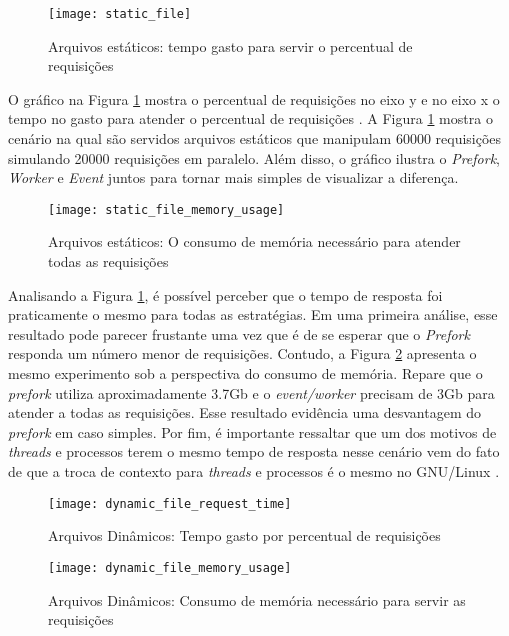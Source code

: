 \begin{figure}[!h]
  \centering
  \texttt{[image: static\_file]}
  \caption{Arquivos estáticos: tempo gasto para servir o percentual de requisições}
  \label{fig:static_file}
\end{figure}

O gráfico na Figura \ref{fig:static_file} mostra o percentual de requisições no
eixo y e no eixo x o tempo no gasto para atender o percentual de requisições
\citep{apache_ab}. A Figura \ref{fig:static_file} mostra o cenário na qual são
servidos arquivos estáticos que manipulam 60000 requisições simulando 20000
requisições em paralelo. Além disso, o gráfico ilustra o \emph{Prefork},
\emph{Worker} e \emph{Event} juntos para tornar mais simples de visualizar a
diferença.

\begin{figure}[!h]
  \centering
  \texttt{[image: static\_file\_memory\_usage]}
  \caption{Arquivos estáticos: O consumo de memória necessário para atender todas as requisições}
  \label{fig:static_file_memory}
\end{figure}
 
Analisando a Figura \ref{fig:static_file}, é possível perceber que o tempo de
resposta foi praticamente o mesmo para todas as estratégias. Em uma primeira
análise, esse resultado pode parecer frustante uma vez que é de se esperar que
o \emph{Prefork} responda um número menor de requisições. Contudo, a Figura
\ref{fig:static_file_memory} apresenta o mesmo experimento sob a perspectiva do
consumo de memória. Repare que o \emph{prefork} utiliza aproximadamente 3.7Gb e
o \emph{event/worker} precisam de 3Gb para atender a todas as requisições. Esse
resultado evidência uma desvantagem do \emph{prefork} em caso simples. Por fim,
é importante ressaltar que um dos motivos de \emph{threads} e processos terem o
mesmo tempo de resposta nesse cenário vem do fato de que a troca de contexto
para \emph{threads} e processos é o mesmo no GNU/Linux
\citep{linux_kernel_development}.

\begin{figure}[!h]
  \centering
  \texttt{[image: dynamic\_file\_request\_time]}
  \caption{Arquivos Dinâmicos: Tempo gasto por percentual de requisições}
  \label{fig:dynamic_file}
\end{figure}

\begin{figure}[!h]
  \centering
  \texttt{[image: dynamic\_file\_memory\_usage]}
  \caption{Arquivos Dinâmicos: Consumo de memória necessário para servir as requisições}
  \label{fig:dynamic_file_memory}
\end{figure}

